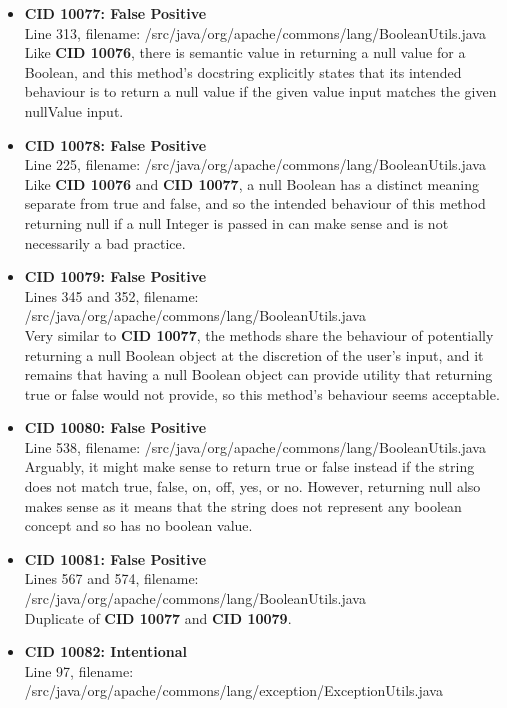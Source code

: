 \documentclass{article}
\begin{document}
\begin{itemize}
\item \textbf{CID 10077: False Positive} \\
    Line 313, filename: /src/java/org/apache/commons/lang/BooleanUtils.java \\
    Like \textbf{CID 10076}, there is semantic value in returning a null value for a Boolean, and this method's docstring
    explicitly states that its intended behaviour is to return a null value if the given value input matches the given nullValue input.
\item \textbf{CID 10078: False Positive} \\
    Line 225, filename: /src/java/org/apache/commons/lang/BooleanUtils.java \\
    Like \textbf{CID 10076} and \textbf{CID 10077}, a null Boolean has a distinct meaning separate from true and false, and 
    so the intended behaviour of this method returning null if a null Integer is passed in can make sense and is not 
    necessarily a bad practice.
\item \textbf{CID 10079: False Positive} \\
    Lines 345 and 352, filename: /src/java/org/apache/commons/lang/BooleanUtils.java \\
    Very similar to \textbf{CID 10077}, the methods share the behaviour of potentially returning a null Boolean object
    at the discretion of the user's input, and it remains that having a null Boolean object can provide utility that
    returning true or false would not provide, so this method's behaviour seems acceptable.
\item \textbf{CID 10080: False Positive} \\
    Line 538, filename: /src/java/org/apache/commons/lang/BooleanUtils.java \\
    Arguably, it might make sense to return true or false instead if the string does not match true, false, 
    on, off, yes, or no. However, returning null also makes sense as it means that the string does not represent
    any boolean concept and so has no boolean value.
\item \textbf{CID 10081: False Positive} \\
    Lines 567 and 574, filename: /src/java/org/apache/commons/lang/BooleanUtils.java \\
    Duplicate of \textbf{CID 10077} and \textbf{CID 10079}.
\item \textbf{CID 10082: Intentional} \\
    Line 97, filename: /src/java/org/apache/commons/lang/exception/ExceptionUtils.java \\

\end{itemize}
\end{document}
